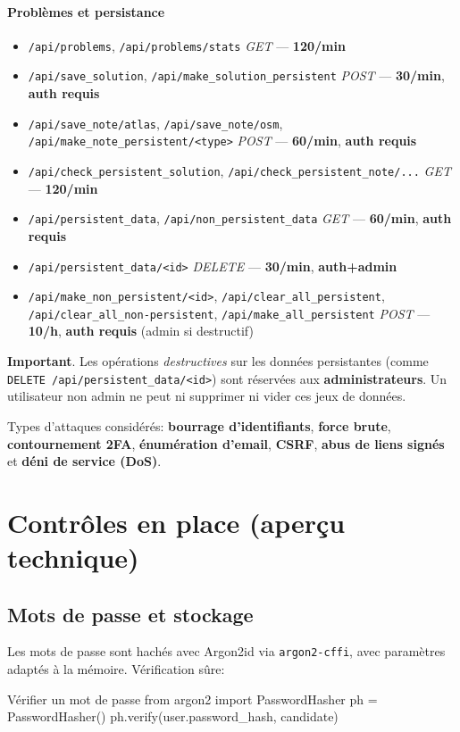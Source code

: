\paragraph{Problèmes et persistance}
\begin{itemize}
  \item \texttt{/api/problems}, \texttt{/api/problems/stats} \textit{GET} — \textbf{120/min}
  \item \texttt{/api/save\_solution}, \texttt{/api/make\_solution\_persistent} \textit{POST} — \textbf{30/min}, \textbf{auth requis}
  \item \texttt{/api/save\_note/atlas}, \texttt{/api/save\_note/osm}, \texttt{/api/make\_note\_persistent/<type>} \textit{POST} — \textbf{60/min}, \textbf{auth requis}
  \item \texttt{/api/check\_persistent\_solution}, \texttt{/api/check\_persistent\_note/...} \textit{GET} — \textbf{120/min}
  \item \texttt{/api/persistent\_data}, \texttt{/api/non\_persistent\_data} \textit{GET} — \textbf{60/min}, \textbf{auth requis}
  \item \texttt{/api/persistent\_data/<id>} \textit{DELETE} — \textbf{30/min}, \textbf{auth+admin}
  \item \texttt{/api/make\_non\_persistent/<id>}, \texttt{/api/clear\_all\_persistent}, \texttt{/api/clear\_all\_non-persistent}, \texttt{/api/make\_all\_persistent} \textit{POST} — \textbf{10/h}, \textbf{auth requis} (admin si destructif)
\end{itemize}

\noindent \textbf{Important}. Les opérations \emph{destructives} sur les données persistantes (comme \texttt{DELETE /api/persistent\_data/<id>}) sont réservées aux \textbf{administrateurs}. Un utilisateur non admin ne peut ni supprimer ni vider ces jeux de données.

\noindent Types d'attaques considérés: \textbf{bourrage d'identifiants}, \textbf{force brute}, \textbf{contournement 2FA}, \textbf{énumération d'email}, \textbf{CSRF}, \textbf{abus de liens signés} et \textbf{déni de service (DoS)}.

\section{Contrôles en place (aperçu technique)}

\subsection*{Mots de passe et stockage}
\noindent Les mots de passe sont hachés avec Argon2id via \texttt{argon2-cffi}, avec paramètres adaptés à la mémoire. Vérification sûre:
\begin{codebox}[language=Python]{Vérifier un mot de passe}
from argon2 import PasswordHasher
ph = PasswordHasher()
ph.verify(user.password_hash, candidate)
\end{codebox}

